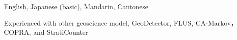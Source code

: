 

\begin{cvskills}


    {English, Japanese (basic), Mandarin, Cantonese}

    { Experienced with other geoscience model, GeoDetector, FLUS, CA-Markov，COPRA, and StratiCounter }


\end{cvskills}
